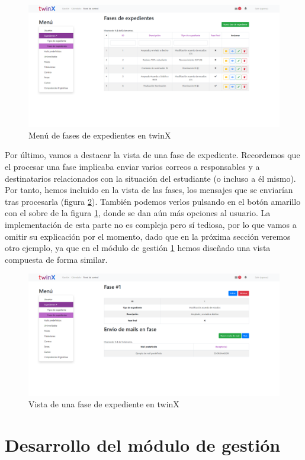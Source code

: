 \begin{figure}
	\centering
	\includegraphics[width=\textwidth]{Capturas de twinX/fases_expedientes_index}
	\caption{Menú de fases de expedientes en twinX}
	\label{fig:fasesexpedientesindex}
\end{figure}

Por último, vamos a destacar la vista de una fase de expediente. Recordemos que el procesar una fase implicaba enviar varios correos a responsables y a destinatarios relacionados con la situación del estudiante (o incluso a él mismo). Por tanto, hemos incluido en la vista de las fases, los mensajes que se enviarían tras procesarla (figura \ref{fig:fasesexpedientesvista}). También podemos verlos pulsando en el botón amarillo con el sobre de la figura \ref{fig:fasesexpedientesindex}, donde se dan aún más opciones al usuario. La implementación de esta parte no es compleja pero sí tediosa, por lo que vamos a omitir su explicación por el momento, dado que en la próxima sección veremos otro ejemplo, ya que en el módulo de gestión \ref{sec:gestion} hemos diseñado una vista compuesta de forma similar.

\begin{figure}
	\centering
	\includegraphics[width=\textwidth]{Capturas de twinX/fases_expedientes_vista}
	\caption{Vista de una fase de expediente en twinX}
	\label{fig:fasesexpedientesvista}
\end{figure}



\section{Desarrollo del módulo de gestión}
\label{sec:gestion}


